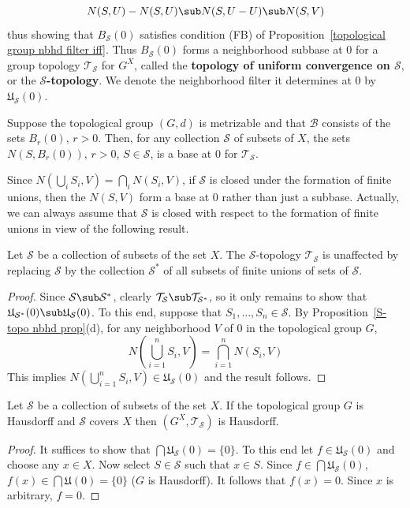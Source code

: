 \[N(S,U)-N(S,U)\sub N(S,U-U)\sub N(S,V)\]
thus showing that $B_{\mathcal{S}}(0)$ satisfies condition (FB) of Proposition~\ref{topological group nbhd filter iff}. Thus $B_{\mathcal{S}}(0)$ forms a neighborhood subbase at $0$ for a group topology $\mathcal{T}_{\mathcal{S}}$ for $G^X$, called the \textbf{topology of uniform convergence on $\mathcal{S}$}, or the \textbf{$\mathcal{S}$-topology}. We denote the neighborhood filter it determines at $0$ by $\mathfrak{U}_{\mathcal{S}}(0)$.\par
Suppose the topological group $(G,d)$ is metrizable and that $\mathcal{B}$ consists of the sets $B_r(0)$, $r>0$. Then, for any collection $\mathcal{S}$ of subsets of $X$, the sets $N(S,B_r(0))$, $r>0$, $S\in\mathcal{S}$, is a base at $0$ for $\mathcal{T}_{\mathcal{S}}$.\par 
Since $N(\bigcup_iS_i,V)=\bigcap_iN(S_i,V)$, if $\mathcal{S}$ is closed under the formation of finite unions, then the $N(S,V)$ form a base at $0$ rather than just a subbase. Actually, we can always assume that $\mathcal{S}$ is closed with respect to the formation of finite unions in view of the following result.
\begin{proposition}\label{S-topo operation on generating set}
Let $\mathcal{S}$ be a collection of subsets of the set $X$. The $\mathcal{S}$-topology $\mathcal{T}_{\mathcal{S}}$ is unaffected by replacing $\mathcal{S}$ by the collection $\mathcal{S}^*$ of all subsets of finite unions of sets of $\mathcal{S}$.
\end{proposition}
\begin{proof}
Since $\mathcal{S}\sub\mathcal{S}^*$, clearly $\mathcal{T}_{\mathcal{S}}\sub\mathcal{T}_{\mathcal{S}^*}$, so it only remains to show that $\mathfrak{U}_{\mathcal{S}^*}(0)\sub\mathfrak{U}_{\mathcal{S}}(0)$. To this end, suppose that $S_1,\dots,S_n\in\mathcal{S}$. By Proposition~\ref{S-topo nbhd prop}(d), for any neighborhood $V$ of $0$ in the topological group $G$,
\[N(\bigcup_{i=1}^{n}S_i,V)=\bigcap_{i=1}^{n}N(S_i,V)\]
This implies $N(\bigcup_{i=1}^{n}S_i,V)\in\mathfrak{U}_{\mathcal{S}}(0)$ and the result follows.
\end{proof}
\begin{proposition}\label{S-topo Hausdorff if}
Let $\mathcal{S}$ be a collection of subsets of the set $X$. If the topological group $G$ is Hausdorff and $\mathcal{S}$ covers $X$ then $(G^X,\mathcal{T}_{\mathcal{S}})$ is Hausdorff.
\end{proposition}
\begin{proof}
It suffices to show that $\bigcap\mathfrak{U}_{\mathcal{S}}(0)=\{0\}$. To this end let $f\in\mathfrak{U}_{\mathcal{S}}(0)$ and choose any $x\in X$. Now select $S\in\mathcal{S}$ such that $x\in S$. Since $f\in\bigcap\mathfrak{U}_{\mathcal{S}}(0)$, $f(x)\in\bigcap\mathfrak{U}(0)=\{0\}$ ($G$ is Hausdorff). It follows that $f(x)=0$. Since $x$ is arbitrary, $f=0$.
\end{proof}
